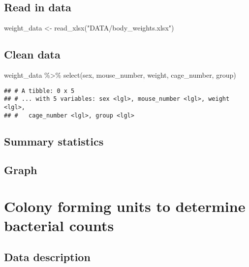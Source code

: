 \documentclass[
]{book}
\newenvironment{Shaded}{\begin{snugshade}}{\end{snugshade}}
\newcommand{\FunctionTok}[1]{\textcolor[rgb]{0.00,0.00,0.00}{#1}}
\newcommand{\NormalTok}[1]{#1}
\newcommand{\OtherTok}[1]{\textcolor[rgb]{0.56,0.35,0.01}{#1}}
\newcommand{\SpecialCharTok}[1]{\textcolor[rgb]{0.00,0.00,0.00}{#1}}
\newcommand{\StringTok}[1]{\textcolor[rgb]{0.31,0.60,0.02}{#1}}
\begin{document}
\hypertarget{read-in-data}{%
\section{Read in data}\label{read-in-data}}

\begin{Shaded}
\begin{Highlighting}[]
\NormalTok{weight\_data }\OtherTok{\textless{}{-}} \FunctionTok{read\_xlsx}\NormalTok{(}\StringTok{"DATA/body\_weights.xlsx"}\NormalTok{)}
\end{Highlighting}
\end{Shaded}

\hypertarget{clean-data}{%
\section{Clean data}\label{clean-data}}

\begin{Shaded}
\begin{Highlighting}[]
\NormalTok{weight\_data }\SpecialCharTok{\%\textgreater{}\%}
  \FunctionTok{select}\NormalTok{(sex, mouse\_number, weight, cage\_number, group)}
\end{Highlighting}
\end{Shaded}

\begin{verbatim}
## # A tibble: 0 x 5
## # ... with 5 variables: sex <lgl>, mouse_number <lgl>, weight <lgl>,
## #   cage_number <lgl>, group <lgl>
\end{verbatim}

\hypertarget{summary-statistics}{%
\section{Summary statistics}\label{summary-statistics}}

\hypertarget{graph}{%
\section{Graph}\label{graph}}

\hypertarget{colony-forming-units-to-determine-bacterial-counts}{%
\chapter{Colony forming units to determine bacterial counts}\label{colony-forming-units-to-determine-bacterial-counts}}

\hypertarget{data-description}{%
\section{Data description}\label{data-description}}
\end{document}
